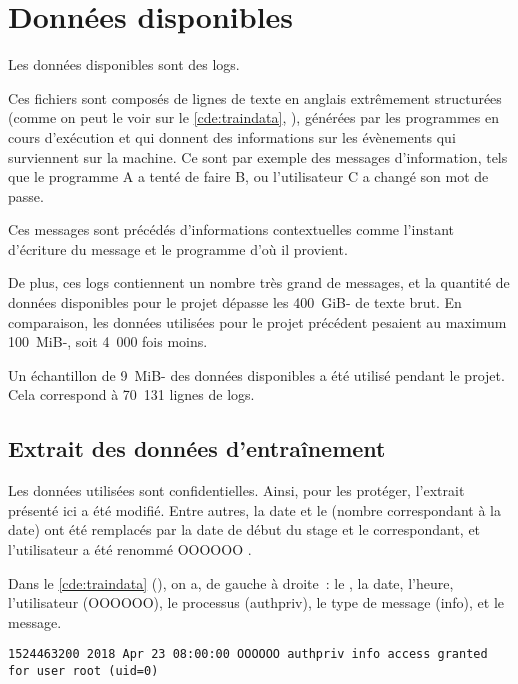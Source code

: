 \chapter{Données disponibles}\label{ch:data_papud}
Les données disponibles sont des \glspl{log}. \label{def:log}

Ces fichiers sont composés de lignes de texte en anglais extrêmement structurées (comme on peut le voir sur le \autoref{cde:traindata}, ), générées par les programmes en cours d'exécution et qui donnent des informations sur les évènements qui surviennent sur la machine.
Ce sont par exemple des messages d'information, tels que \og le programme A a tenté de faire B\fg{}, ou \og l'utilisateur C a changé son mot de passe\fg{}.

Ces messages sont précédés d'informations contextuelles comme l'instant d'écriture du message et le programme d'où il provient.

De plus, ces \glspl{log} contiennent un nombre très grand de messages, et la quantité de données disponibles pour le projet dépasse les 400~\gls{GiB-} de texte brut. En comparaison, les données utilisées pour le projet précédent pesaient au maximum 100~\gls{MiB-}, soit 4~000 fois moins.

Un échantillon de 9~\gls{MiB-} des données disponibles a été utilisé pendant le projet.
Cela correspond à 70~131 lignes de \glspl{log}.

\section{Extrait des données d'entraînement}%
Les données utilisées sont confidentielles.
Ainsi, pour les protéger, l'extrait présenté ici a été modifié.
Entre autres, la date et le  (nombre correspondant à la date) ont été remplacés par la date de début du stage et le  correspondant, et l'utilisateur a été renommé \og OOOOOO \fg{}.

Dans le \autoref{cde:traindata} (), on a, de gauche à droite~: le , la date, l'heure, l'utilisateur (OOOOOO), le processus (authpriv), le type de message (info), et le message.

\begin{lstlisting}[caption={Exemple de ligne extraite d'un des fichiers de journalisation},label=cde:traindata]
	1524463200 2018 Apr 23 08:00:00 OOOOOO authpriv info access granted for user root (uid=0)
\end{lstlisting}

